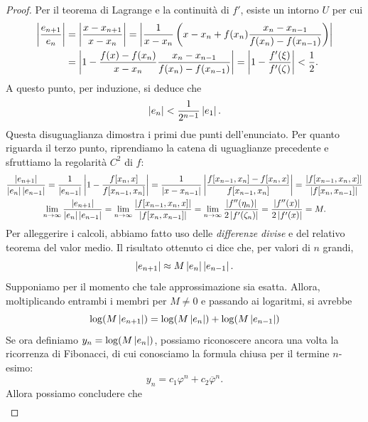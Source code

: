 \begin{proof}
Per il teorema di Lagrange e la continuità di $f'$, esiste un intorno $U$ per cui
\begin{equation} \label{eq:disuguaglianza-rapporto-errori}
\begin{split}
\left\lvert\frac{e_{n+1}}{e_n}\right\rvert
&= \left\lvert\frac{x-x_{n+1}}{x-x_n}\right\rvert
 = \left\lvert\frac{1}{x-x_n}
	   \left(x - x_n + f(x_n) \frac{x_n-x_{n-1}}{f(x_n)-f(x_{n-1})}\right)\right\rvert \\
&= \left\lvert1 - \frac{f(x)-f(x_n)}{x-x_n} \frac{x_n - x_{n-1}}{f(x_n)-f(x_{n-1})}\right\rvert
= \left\lvert1 - \frac{f'(\xi)}{f'(\zeta)}\right\rvert
< \frac{1}{2}.
\end{split}
\end{equation}
A questo punto, per induzione, si deduce che
\[
\left\lvert e_n\right\rvert < \frac{1}{2^{n-1}} \left\lvert e_1\right\rvert.
\]
Questa disuguaglianza dimostra i primi due punti dell'enunciato.
Per quanto riguarda il terzo punto, riprendiamo la catena di uguaglianze
precedente e sfruttiamo la regolarità $C^2$ di $f$:
\begin{gather*}
\frac{\left\lvert e_{n+1}\right\rvert}{\left\lvert e_n\right\rvert \left\lvert e_{n-1}\right\rvert}
= \frac{1}{\left\lvert e_{n-1}\right\rvert} \left\lvert1-\frac{f[x_n,x]}{f[x_{n-1},x_n]}\right\rvert
= \frac{1}{\left\lvert x-x_{n-1}\right\rvert} \left\lvert\frac{f[x_{n-1},x_n]-f[x_n,x]}{f[x_{n-1},x_n]}\right\rvert
= \frac{\left\lvert f[x_{n-1},x_n,x]\right\rvert}{\left\lvert f[x_n,x_{n-1}]\right\rvert} \\
\lim_{n \to \infty} \frac{\left\lvert e_{n+1}\right\rvert}{\left\lvert e_n\right\rvert \left\lvert e_{n-1}\right\rvert}
= \lim_{n \to \infty} \frac{\left\lvert f[x_{n-1},x_n,x]\right\rvert}{\left\lvert f[x_n,x_{n-1}]\right\rvert}
= \lim_{n \to \infty} \frac{\left\lvert f''(\eta_n)\right\rvert}{2\left\lvert f'(\zeta_n)\right\rvert}
= \frac{\left\lvert f''(x)\right\rvert}{2\left\lvert f'(x)\right\rvert}
= M.
\end{gather*}
Per alleggerire i calcoli, abbiamo fatto uso delle \emph{differenze divise}
e del relativo teorema del valor medio.
Il risultato ottenuto ci dice che, per valori di $n$ grandi,
\begin{equation} \label{eq:approssimazione-secanti}
\left\lvert e_{n+1}\right\rvert \approx M \left\lvert e_n\right\rvert \left\lvert e_{n-1}\right\rvert.
\end{equation}
Supponiamo per il momento che tale approssimazione sia esatta.
Allora, moltiplicando entrambi i membri per $M \neq 0$ e passando ai logaritmi,
si avrebbe
\[
\log(M\left\lvert e_{n+1}\right\rvert) = \log(M\left\lvert e_n\right\rvert) + \log(M\left\lvert e_{n-1}\right\rvert)
\]
Se ora definiamo $y_n = \log(M\left\lvert e_n\right\rvert)$, possiamo riconoscere
ancora una volta la ricorrenza di Fibonacci,
di cui conosciamo la formula chiusa per il termine $n$-esimo:
\[
y_n = c_1 \varphi^n + c_2 \overline{\varphi}^n.
\]
Allora possiamo concludere che
\begin{equation} \label{eq:limite-tesi-secanti}
\begin{aligned}

\end{aligned}
\end{equation}
\end{proof}

